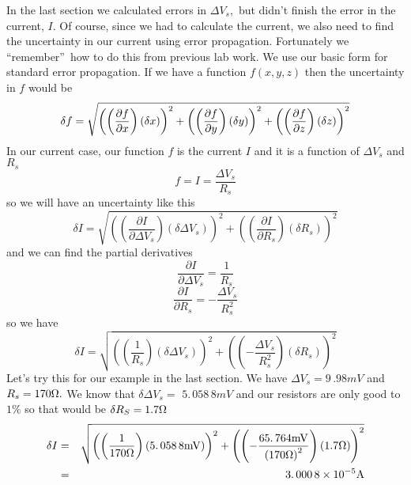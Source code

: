 In the last section we calculated 
errors in $\Delta V_{s},$ but didn't finish the
error in the current, $I.$ Of course, since we had to calculate the current,
we also need to find the uncertainty in our current using error propagation.
Fortunately we \textquotedblleft remember\textquotedblright\ how to do this
from previous lab work. 
We use our basic form for standard error propagation. If we have
a function $f\left( x,y,z\right) $ then the uncertainty in $f$ would be 
\begin{equation*}
\delta f=\sqrt{\left( \left( \frac{\partial f}{\partial x}\right) \left(
\delta x\right) \right) ^{2}+\left( \left( \frac{\partial f}{\partial y}%
\right) \left( \delta y\right) \right) ^{2}+\left( \left( \frac{\partial f}{%
\partial z}\right) \left( \delta z\right) \right) ^{2}}
\end{equation*}%
In our current case, our function $f$ is the current $I$ and it is a
function of $\Delta V_{s}$ and $R_{s}$ 
\begin{equation*}
f=I=\frac{\Delta V_{s}}{R_{s}}
\end{equation*}%
so we will have an uncertainty like this%
\begin{equation*}
\delta I=\sqrt{\left( \left( \frac{\partial I}{\partial \Delta V_{s}}\right)
\left( \delta \Delta V_{s}\right) \right) ^{2}+\left( \left( \frac{\partial I%
}{\partial R_{s}}\right) \left( \delta R_{s}\right) \right) ^{2}}
\end{equation*}%
and we can find the partial derivatives%
\begin{equation*}
\frac{\partial I}{\partial \Delta V_{s}}=\frac{1}{R_{s}}
\end{equation*}%
\begin{equation*}
\frac{\partial I}{\partial R_{s}}=-\frac{\Delta V_{s}}{R_{s}^{2}}
\end{equation*}%
so we have 
\begin{equation*}
\delta I=\sqrt{\left( \left( \frac{1}{R_{s}}\right) \left( \delta \Delta
V_{s}\right) \right) ^{2}+\left( \left( -\frac{\Delta V_{s}}{R_{s}^{2}}%
\right) \left( \delta R_{s}\right) \right) ^{2}}
\end{equation*}%
Let's try this for our example in the last section. We have $\Delta
V_{s}=9\,.98\unit{mV}$ and $R_{s}=170\unit{%
\Omega%
}.$ We know that $\delta \Delta V_{s}=$ $5.\,\allowbreak 058\,8\unit{mV}$
and our resistors are only good to $1\%$ so that would be $\delta R_{S}=1.7%
\unit{%
\Omega%
}$%
\begin{eqnarray*}
\delta I &=&\sqrt{\left( \left( \frac{1}{170\unit{%
\Omega%
}}\right) \left( 5.\,\allowbreak 058\,8\unit{mV}\right) \right) ^{2}+\left(
\left( -\frac{65.\,\allowbreak 764\unit{mV}}{\left( 170\unit{%
\Omega%
}\right) ^{2}}\right) \left( 1.7\unit{%
\Omega%
}\right) \right) ^{2}} \\
&=&3.\,\allowbreak 000\,8\times 10^{-5}\unit{A}
\end{eqnarray*}

